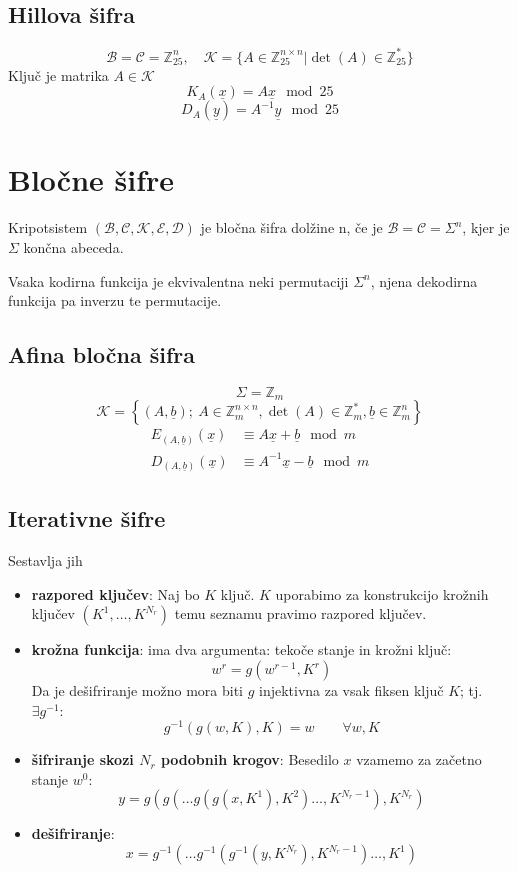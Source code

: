 \begin{multicols}{4}
\subsection*{Hillova šifra}
\[ \mathcal{B} = \mathcal{C} = \mathbb{Z}_{25}^n, \quad \mathcal{K} = \{ A \in \mathbb{Z}_{25}^{n\times n} | \det(A) \in \mathbb{Z}_{25}^* \}\]
Ključ je matrika $A \in \mathcal{K}$
\[ K_A(\underline{x}) = A \underline{x} \mod 25\]
\[ D_A(\underline{y}) = A^{-1} \underline{y} \mod 25\]

\section*{Bločne šifre}
Kripotsistem $(\mathcal{B}, \mathcal{C}, \mathcal{K}, \mathcal{E}, \mathcal{D})$ je bločna šifra dolžine n, 
če je $\mathcal{B} = \mathcal{C} = \Sigma^n$, kjer je $\Sigma$ končna abeceda.

Vsaka kodirna funkcija je ekvivalentna neki permutaciji $\Sigma^n$, njena dekodirna funkcija pa inverzu te permutacije.

\subsection*{Afina bločna šifra}
\[ \Sigma = \mathbb{Z}_m \]
\[ \mathcal{K} = \left\{ (A, \underline{b});\ A \in \mathbb{Z}_m^{n\times n}, \det(A) \in \mathbb{Z}_m^*, \underline{b} \in \mathbb{Z}^n_m \right\}  \]
\begin{align*}
	E_{(A, \underline{b})}(\underline{x}) &\equiv A \underline{x} + \underline{b} \mod m \\
	D_{(A, \underline{b})}(\underline{x}) &\equiv A^{-1} \underline{x} - \underline{b} \mod m 
\end{align*}

\subsection*{Iterativne šifre}
Sestavlja jih 

\begin{itemize}
	\item \textbf{razpored ključev}: Naj bo $K$ ključ. $K$ uporabimo za konstrukcijo krožnih ključev $(K^1,\dots, K^{N_r})$ temu seznamu pravimo razpored ključev.
	\item \textbf{krožna funkcija}: ima dva argumenta: tekoče stanje in krožni ključ:
	\[ w^r = g(w^{r-1}, K^{r}) \]
	Da je dešifriranje možno mora biti $g$ injektivna za vsak fiksen ključ $K$; tj. $\exists g^{-1}:$
	\[ g^{-1}(g(w, K), K) = w \qquad \forall w, K\]
	\item \textbf{šifriranje skozi $N_r$ podobnih krogov}: Besedilo $x$ vzamemo za začetno stanje $w^0$:
	\[ y = g(g(\dots g(g(x, K^1), K^2) \dots, K^{N_r - 1}), K^{N_r})\]
	\item \textbf{dešifriranje}:
	\[ x = g^{-1}(\dots g^{-1}(g^{-1}(y, K^{N_r}), K^{N_r - 1}) \dots, K^1)\]
\end{itemize}



\end{multicols}
